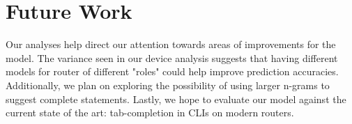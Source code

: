 \section{Future Work}

Our analyses help direct our attention towards areas of improvements for the model. The variance seen in our device analysis suggests that having different models for router of different "roles" could help improve prediction accuracies. Additionally, we plan on exploring the possibility of using larger n-grams to suggest complete statements. Lastly, we hope to evaluate our model against the current state of the art: tab-completion in CLIs on modern routers.